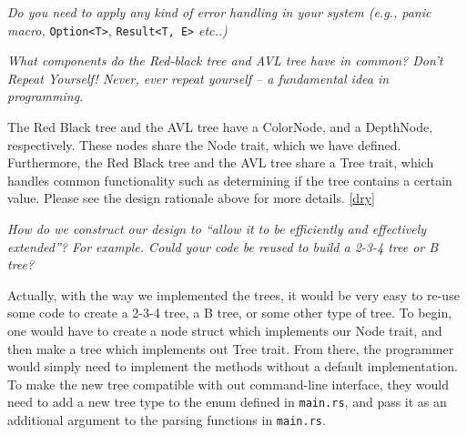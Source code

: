 \documentclass[letterpaper]{article}
\begin{document}
\textit{Do you need to apply any kind of error handling in your system (e.g.,
panic macro,}
\verb|Option<T>|, \verb|Result<T, E>| \textit{etc..)}

\textit{What components do the Red-black tree and AVL tree have in common? Don’t Repeat
Yourself! Never, ever repeat yourself – a fundamental idea in programming.}

The Red Black tree and the AVL tree have a ColorNode, and a DepthNode,
respectively. These nodes share the Node trait, which we have defined.
Furthermore, the Red Black tree and the AVL tree share a Tree trait, which
handles common functionality such as determining if the tree contains a certain
value.
Please see the design rationale above for more details. \ref{dry}

\textit{How do we construct our design to “allow it to be efficiently and
effectively extended”? For example. Could your code be reused to build a 2-3-4
tree or B tree?}

Actually, with the way we implemented the trees, it would be very easy to re-use
some code to create a 2-3-4 tree, a B tree, or some other type of tree. To
begin, one would have to create a node struct which implements our Node trait,
and then make a tree which implements out Tree trait. From there, the programmer
would simply need to implement the methods without a default implementation.
To make the new tree compatible with out command-line interface, they would need
to add a new tree type to the enum defined in \texttt{main.rs}, and pass it
as an additional argument to the parsing functions in \texttt{main.rs}.
\end{document}
